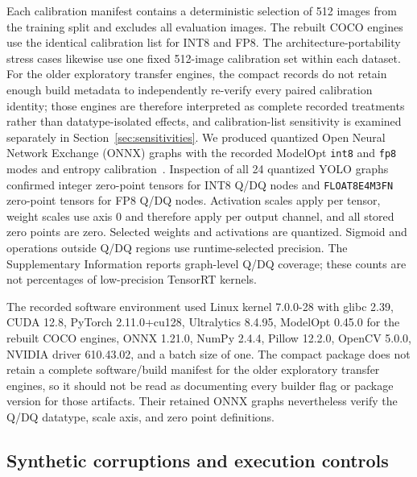 \documentclass[a4paper,fleqn]{cas-dc}
\begin{document}
Each calibration manifest contains a deterministic selection of 512 images from the training split and excludes all evaluation images. The rebuilt COCO engines use the identical calibration list for INT8 and FP8. The architecture-portability stress cases likewise use one fixed 512-image calibration set within each dataset. For the older exploratory transfer engines, the compact records do not retain enough build metadata to independently re-verify every paired calibration identity; those engines are therefore interpreted as complete recorded treatments rather than datatype-isolated effects, and calibration-list sensitivity is examined separately in Section~\ref{sec:sensitivities}. We produced quantized Open Neural Network Exchange (ONNX) graphs with the recorded ModelOpt \texttt{int8} and \texttt{fp8} modes and entropy calibration~\citep{nvidia2026modelopt}. Inspection of all 24 quantized YOLO graphs confirmed integer zero-point tensors for INT8 Q/DQ nodes and \texttt{FLOAT8E4M3FN} zero-point tensors for FP8 Q/DQ nodes. Activation scales apply per tensor, weight scales use axis 0 and therefore apply per output channel, and all stored zero points are zero. Selected weights and activations are quantized. Sigmoid and operations outside Q/DQ regions use runtime-selected precision. The Supplementary Information reports graph-level Q/DQ coverage; these counts are not percentages of low-precision TensorRT kernels.

The recorded software environment used Linux kernel 7.0.0-28 with glibc 2.39, CUDA 12.8, PyTorch 2.11.0+cu128, Ultralytics 8.4.95, ModelOpt 0.45.0 for the rebuilt COCO engines, ONNX 1.21.0, NumPy 2.4.4, Pillow 12.2.0, OpenCV 5.0.0, NVIDIA driver 610.43.02, and a batch size of one. The compact package does not retain a complete software/build manifest for the older exploratory transfer engines, so it should not be read as documenting every builder flag or package version for those artifacts. Their retained ONNX graphs nevertheless verify the Q/DQ datatype, scale axis, and zero point definitions.

\subsection{Synthetic corruptions and execution controls}
\label{sec:corruptions}
\end{document}
